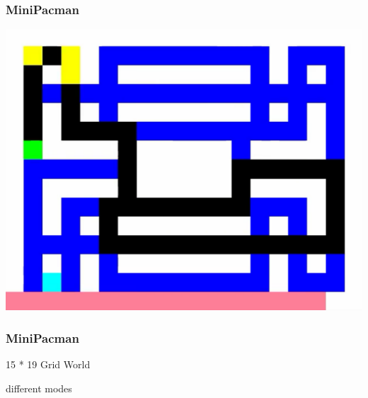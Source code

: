 \PraesentationMasterWeissBlau 
\begin{frame} 
    \frametitle{MiniPacman}
\includegraphics[height=0.5\textheight]{./Images/mini_pacman.png}%
\end{frame} 

\PraesentationMasterStandard

\begin{frame}
    \frametitle{MiniPacman}

\begin{PraesentationAufzaehlung}
	\item 15 * 19 Grid World
	\item different modes
\end{PraesentationAufzaehlung}
    
\end{frame}
\clearpage




